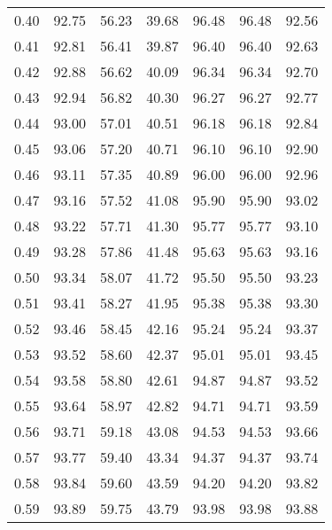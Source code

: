 \begin{tabular}{|c|c|c|c|c|c|c|}
      0.40 &     92.75 &     56.23 &      39.68 &   96.48 &      96.48 &         92.56 \\
      0.41 &     92.81 &     56.41 &      39.87 &   96.40 &      96.40 &         92.63 \\
      0.42 &     92.88 &     56.62 &      40.09 &   96.34 &      96.34 &         92.70 \\
      0.43 &     92.94 &     56.82 &      40.30 &   96.27 &      96.27 &         92.77 \\
      0.44 &     93.00 &     57.01 &      40.51 &   96.18 &      96.18 &         92.84 \\
      0.45 &     93.06 &     57.20 &      40.71 &   96.10 &      96.10 &         92.90 \\
      0.46 &     93.11 &     57.35 &      40.89 &   96.00 &      96.00 &         92.96 \\
      0.47 &     93.16 &     57.52 &      41.08 &   95.90 &      95.90 &         93.02 \\
      0.48 &     93.22 &     57.71 &      41.30 &   95.77 &      95.77 &         93.10 \\
      0.49 &     93.28 &     57.86 &      41.48 &   95.63 &      95.63 &         93.16 \\
      0.50 &     93.34 &     58.07 &      41.72 &   95.50 &      95.50 &         93.23 \\
      0.51 &     93.41 &     58.27 &      41.95 &   95.38 &      95.38 &         93.30 \\
      0.52 &     93.46 &     58.45 &      42.16 &   95.24 &      95.24 &         93.37 \\
      0.53 &     93.52 &     58.60 &      42.37 &   95.01 &      95.01 &         93.45 \\
      0.54 &     93.58 &     58.80 &      42.61 &   94.87 &      94.87 &         93.52 \\
      0.55 &     93.64 &     58.97 &      42.82 &   94.71 &      94.71 &         93.59 \\
      0.56 &     93.71 &     59.18 &      43.08 &   94.53 &      94.53 &         93.66 \\
      0.57 &     93.77 &     59.40 &      43.34 &   94.37 &      94.37 &         93.74 \\
      0.58 &     93.84 &     59.60 &      43.59 &   94.20 &      94.20 &         93.82 \\
      0.59 &     93.89 &     59.75 &      43.79 &   93.98 &      93.98 &         93.88 \\

\end{tabular}
